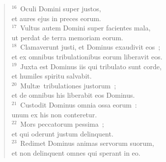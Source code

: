 \begin{flushleft}
\begin{verse}
${}^{16}$~Oculi Domini super justos,\\ et aures ejus in preces eorum.\\
${}^{17}$~Vultus autem Domini super facientes mala,\\ ut perdat de terra memoriam eorum.\\
${}^{18}$~Clamaverunt justi, et Dominus exaudivit eos~;\\ et ex omnibus tribulationibus eorum liberavit eos.\\
${}^{19}$~Juxta est Dominus iis qui tribulato sunt corde,\\ et humiles spiritu salvabit.\\
${}^{20}$~Mult\ae\ tribulationes justorum~;\\ et de omnibus his liberabit eos Dominus.\\
${}^{21}$~Custodit Dominus omnia ossa eorum~:\\ unum ex his non conteretur.\\
${}^{22}$~Mors peccatorum pessima~;\\ et qui oderunt justum delinquent.\\
${}^{23}$~Redimet Dominus animas servorum suorum,\\ et non delinquent omnes qui sperant in eo.\end{verse}\end{flushleft}



